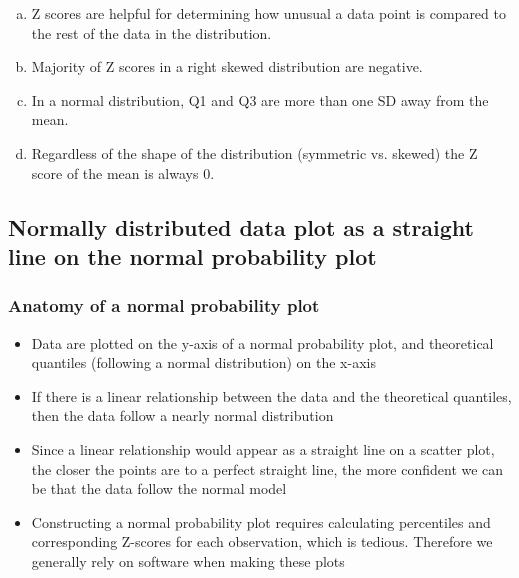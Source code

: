 \documentclass[11pt,containsverbatim,handout,xcolor=xelatex,dvipsnames,table]{beamer}
\newcommand{\solnMult}[1]{#1}
\begin{document}

\begin{frame}


\begin{enumerate}[(a)]
\item Z scores are helpful for determining how unusual a data point is compared to the rest of the data in the distribution.
\item Majority of Z scores in a right skewed distribution are negative.
\item \solnMult{In a normal distribution, Q1 and Q3 are more than one SD away from the mean.}
\item Regardless of the shape of the distribution (symmetric vs. skewed) the Z score of the mean is always 0.
\end{enumerate}

\end{frame}


\subsection{Normally distributed data plot as a straight line on the normal probability plot}
\label{mi5normal}


\begin{frame}
\frametitle{Anatomy of a normal probability plot}

\begin{itemize}

\item Data are plotted on the y-axis of a normal probability plot, and theoretical quantiles (following a normal distribution) on the x-axis

\pause

\item If there is a linear relationship between the data and the theoretical quantiles, then the data follow a nearly normal distribution

\pause

\item Since a linear relationship would appear as a straight line on a scatter plot, the closer the points are to a perfect straight line, the more confident we can be that the data follow the normal model

\pause

\item Constructing a normal probability plot requires calculating percentiles and corresponding Z-scores for each observation, which is tedious. Therefore we generally rely on software when making these plots

\end{itemize}

\end{frame}
\end{document}
